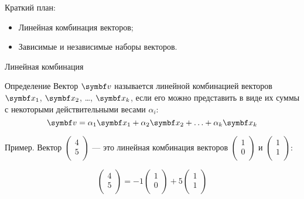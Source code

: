 
\begin{frame} %


\end{frame}



\begin{frame}{Краткий план:}
  \begin{itemize}[<+->]
    \item Линейная комбинация векторов;
    \item Зависимые и независимые наборы векторов.
  \end{itemize}

\end{frame}


\begin{frame}{Линейная комбинация}

\begin{block}{Определение} 
Вектор $\bv$ называется \alert{линейной комбинацией} векторов $\bx_1$, $\bx_2$, \ldots, $\bx_k$, 
если его можно представить в виде их суммы с некоторыми действительными весами $\alpha_i$:
\[
  \bv = \alpha_1 \bx_1 + \alpha_2 \bx_2 + \ldots + \alpha_k \bx_k
\]
\end{block}

\pause
Пример. Вектор $\begin{pmatrix}
  4 \\
  5 \\
\end{pmatrix}$ — это линейная комбинация векторов $\begin{pmatrix}
  1 \\
  0 \\
\end{pmatrix}$ и $\begin{pmatrix}
  1 \\
  1 \\
\end{pmatrix}$:

\[
\begin{pmatrix}
  4 \\
  5 \\
\end{pmatrix} = -1 \begin{pmatrix}
  1 \\
  0 \\
\end{pmatrix} + 5 \begin{pmatrix}
  1 \\
  1 \\
\end{pmatrix}  
\]


\end{frame}



